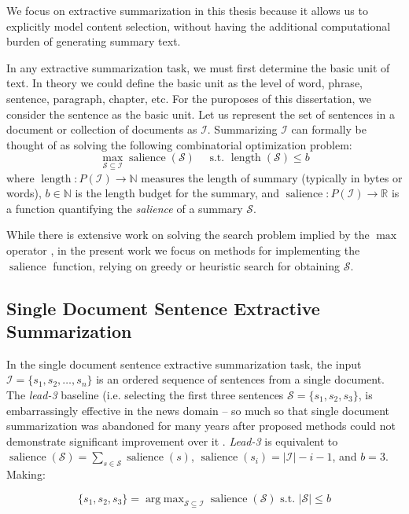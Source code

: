 We focus on extractive summarization in this thesis because it allows us to
explicitly model content selection, without having the additional computational
burden of generating summary text. 


In any extractive summarization task, we must first determine the basic unit
of text. In theory we could define the basic unit as the level of
word, phrase, sentence, paragraph, chapter, etc. For the puroposes
of this dissertation, we consider the sentence as the basic unit.
Let us represent the set of sentences in a document or collection of 
documents as $\mathcal{I}$.
Summarizing $\mathcal{I}$ can formally be 
thought of as solving the following combinatorial optimization problem: 
\[ \max_{\mathcal{S} \subseteq \mathcal{I}} \operatorname{salience}(\mathcal{S}) 
\textrm{~~~~s.t. } \operatorname{length}(\mathcal{S}) \le b \]
where $\operatorname{length} : P(\mathcal{I}) \rightarrow \mathbb{N}$ measures the 
length of summary (typically in bytes or words), $b \in \mathbb{N}$ is
the length budget for the summary, 
and 
$\operatorname{salience} : P(\mathcal{I}) \rightarrow \mathbb{R}$ is a function
quantifying the \emph{salience} of a summary $\mathcal{S}$.


While there is extensive work on solving the search problem 
implied by the $\max$ operator \cite{}, in the present work we focus 
on methods for implementing the $\operatorname{salience}$ function, 
relying on greedy or heuristic search for obtaining $\mathcal{S}$.  

\subsection{Single Document Sentence Extractive Summarization}

In the single document sentence extractive summarization task, the input 
$\mathcal{I} = \{ s_1, s_2, \ldots, s_n \}$ is an ordered sequence of 
sentences from a single document. The \textit{lead-3} baseline (i.e. selecting
the first three sentences $\mathcal{S} = \{ s_1, s_2, s_3 \}$, is 
embarrassingly effective in the news domain -- so much so that single 
document summarization was abandoned for many years after proposed methods
could not demonstrate significant improvement over it \cite{}. 
\textit{Lead-3} is equivalent to $\operatorname{salience}(\mathcal{S}) = 
\sum_{s \in \mathcal{S}} \operatorname{salience}(s)$,  $\operatorname{salience}(s_i) = |\mathcal{I}| - i - 1$, and  $b = 3$. Making:

\[ \{s_1, s_2, s_3 \} = \operatorname{arg\;max}_{\mathcal{S} \subseteq \mathcal{I}} \operatorname{salience}(\mathcal{S}) \textrm{ s.t. } |\mathcal{S}| \le b 
\]

